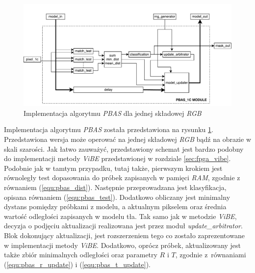 	\begin{figure}[h!]
		\centering
		\includegraphics[scale=0.55]{img/4/pbas_1c.pdf}
		\caption{Implementacja algorytmu \textit{PBAS} dla jednej składowej \textit{RGB}}
		\label{fig:pbas_1c_diagram}
	\end{figure}	
	
Implementacja algorytmu \textit{PBAS} została przedstawiona na rysunku \ref{fig:pbas_1c_diagram}. Przedstawiona wersja może operować na jednej składowej \textit{RGB} bądź na obrazie w skali szarości. Jak łatwo zauważyć, przedstawiony schemat jest bardzo podobny do implementacji metody \textit{ViBE} przedstawionej w rozdziale \ref{sec:fpga_vibe}. 
Podobnie jak w tamtym przypadku, tutaj także, pierwszym krokiem jest równoległy test dopasowania do próbek zapisanych w pamięci \textit{RAM}, zgodnie z równaniem (\ref{equ:pbas_dist}). 
Następnie przeprowadzana jest klasyfikacja, opisana równaniem (\ref{equ:pbas_test}). 
Dodatkowo obliczany jest minimalny dystans pomiędzy próbkami z modelu, a aktualnym pikselem oraz średnia wartość odległości zapisanych w modelu tła.
Tak samo jak w metodzie \textit{ViBE}, decyzja o podjęciu aktualizacji realizowana jest przez moduł \textit{update\_arbitrator}. 
Blok dokonujący aktualizacji, jest rozszerzeniem tego co zostało zaprezentowane w implementacji metody \textit{ViBE}. 
Dodatkowo, oprócz próbek, aktualizowany jest także zbiór minimalnych odległości oraz parametry $R$ i $T$, zgodnie z~równaniami (\ref{equ:pbas_r_update}) i (\ref{equ:pbas_t_update}).

